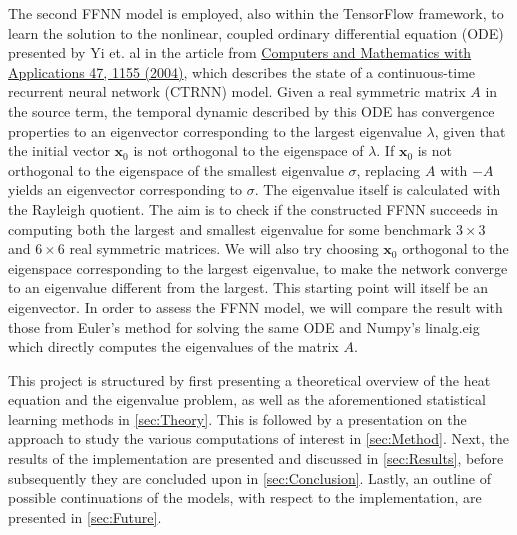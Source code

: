 The second FFNN model is employed, also within the TensorFlow framework, to learn the solution to the nonlinear, coupled ordinary differential equation (ODE) presented by Yi et. al in the article from \href{https://www.sciencedirect.com/science/article/pii/S0898122104901101}{Computers and Mathematics with Applications 47, 1155 (2004)}, which describes the state of a continuous-time recurrent neural network (CTRNN) model. Given a real symmetric matrix $A$ in the source term, the temporal dynamic described by this ODE has convergence properties to an eigenvector corresponding to the largest eigenvalue $\lambda$, given that the initial vector $\mathbf{x}_0$ is not orthogonal to the eigenspace of $\lambda$. If $\mathbf{x}_0$ is not orthogonal to the eigenspace of the smallest eigenvalue $\sigma$, replacing $A$ with $-A$ yields an eigenvector corresponding to $\sigma$. The eigenvalue itself is calculated with the Rayleigh quotient. The aim is to check if the constructed FFNN succeeds in computing both the largest and smallest eigenvalue for some benchmark $3\times 3$ and $6\times 6$ real symmetric matrices. We will also try choosing $\mathbf{x}_0$ orthogonal to the eigenspace corresponding to the largest eigenvalue, to make the network converge to an eigenvalue different from the largest. This starting point will itself be an eigenvector. In order to assess the FFNN model, we will compare the result with those from Euler's method for solving the same ODE and Numpy's linalg.eig which directly computes the eigenvalues of the matrix $A$. 

This project is structured by first presenting a theoretical overview of the heat equation and the eigenvalue problem, as well as the aforementioned statistical learning methods in \autoref{sec:Theory}. This is followed by a presentation on the approach to study the various computations of interest in \autoref{sec:Method}. Next, the results of the implementation are presented and discussed in \autoref{sec:Results}, before subsequently they are concluded upon in \autoref{sec:Conclusion}. Lastly, an outline of possible continuations of the models, with respect to the implementation, are presented in \autoref{sec:Future}.